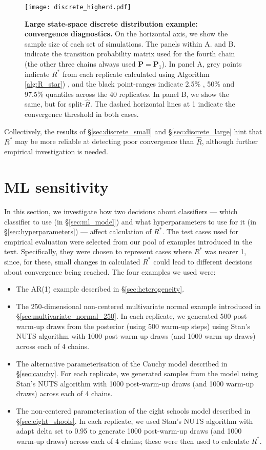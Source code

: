 \documentclass{article}
\begin{document}
\begin{figure}[!htb]
	\centerline{\texttt{[image: discrete\_higherd.pdf]}}
	\caption{\textbf{Large state-space discrete distribution example: convergence diagnostics.} On the horizontal axis, we show the sample size of each set of simulations. The panels within A. and B. indicate the transition probability matrix used for the fourth chain (the other three chains always used $\boldsymbol{P}=\boldsymbol{P}_1$). In panel A, grey points indicate $R^*$ from each replicate calculated using Algorithm \ref{alg:R_star}) , and the black point-ranges indicate 2.5\% , 50\% and 97.5\% quantiles across the 40 replicates. In panel B, we show the same, but for split-$\widehat{R}$. The dashed horizontal lines at 1 indicate the convergence threshold in both cases.}
	\label{fig:discrete_higherd}
\end{figure}

Collectively, the results of \S\ref{sec:discrete_small} and \S\ref{sec:discrete_large} hint that $R^*$ may be more reliable at detecting poor convergence than $\widehat{R}$, although further empirical investigation is needed.

\color{black}

\color{red}
\section{ML sensitivity}\label{sec:ML_sensitivity}
In this section, we investigate how two decisions about classifiers — which classifier to use (in \S\ref{sec:ml_model}) and what hyperparameters to use for it (in \S\ref{sec:hyperparameters}) — affect calculation of $R^*$. The test cases used for empirical evaluation were selected from our pool of examples introduced in the text. Specifically, they were chosen to represent cases where $R^*$ was nearer 1, since, for these, small changes in calculated $R^*$ could lead to different decisions about convergence being reached. The four examples we used were:

\begin{itemize}
	\item The AR(1) example described in \S\ref{sec:heterogeneity}.
	\item The 250-dimensional non-centered multivariate normal example introduced in \S\ref{sec:multivariate_normal_250}. In each replicate, we generated 500 post-warm-up draws from the posterior (using 500 warm-up steps) using Stan's NUTS algorithm with 1000 post-warm-up draws (and 1000 warm-up draws) across each of 4 chains.
	\item The alternative parameterisation of the Cauchy model described in \S\ref{sec:cauchy}. For each replicate, we generated samples from the model using Stan's NUTS algorithm with 1000 post-warm-up draws (and 1000 warm-up draws) across each of 4 chains.
	\item The non-centered parameterisation of the eight schools model described in \S\ref{sec:eight_shools}. In each replicate, we used Stan's NUTS algorithm with adapt delta set to 0.95 to generate 1000 post-warm-up draws (and 1000 warm-up draws) across each of 4 chains; these were then used to calculate $R^*$.
\end{itemize}
\end{document}
